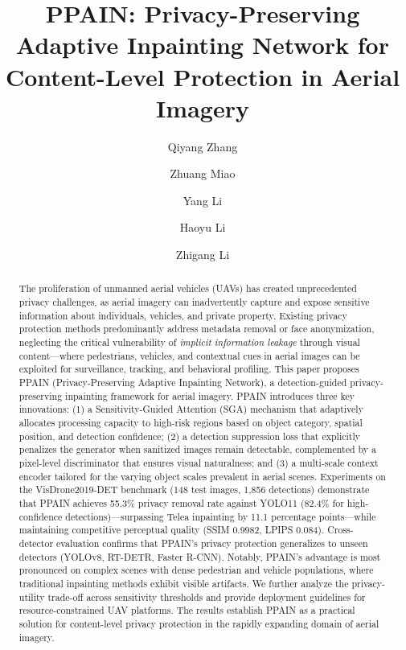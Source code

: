 \documentclass[preprint,12pt]{elsarticle}
\begin{document}
\begin{frontmatter}

\title{PPAIN: Privacy-Preserving Adaptive Inpainting Network for Content-Level Protection in Aerial Imagery}

\author[inst1]{Qiyang Zhang}
\author[inst1]{Zhuang Miao}
\author[inst1]{Yang Li}
\author[inst1]{Haoyu Li}
\author[inst1]{Zhigang Li}



\begin{abstract}
The proliferation of unmanned aerial vehicles (UAVs) has created unprecedented privacy challenges, as aerial imagery can inadvertently capture and expose sensitive information about individuals, vehicles, and private property. Existing privacy protection methods predominantly address metadata removal or face anonymization, neglecting the critical vulnerability of \emph{implicit information leakage} through visual content---where pedestrians, vehicles, and contextual cues in aerial images can be exploited for surveillance, tracking, and behavioral profiling. This paper proposes PPAIN (Privacy-Preserving Adaptive Inpainting Network), a detection-guided privacy-preserving inpainting framework for aerial imagery. PPAIN introduces three key innovations: (1) a Sensitivity-Guided Attention (SGA) mechanism that adaptively allocates processing capacity to high-risk regions based on object category, spatial position, and detection confidence; (2) a detection suppression loss that explicitly penalizes the generator when sanitized images remain detectable, complemented by a pixel-level discriminator that ensures visual naturalness; and (3) a multi-scale context encoder tailored for the varying object scales prevalent in aerial scenes. Experiments on the VisDrone2019-DET benchmark (148 test images, 1,856 detections) demonstrate that PPAIN achieves 55.3\% privacy removal rate against YOLO11 (82.4\% for high-confidence detections)---surpassing Telea inpainting by 11.1 percentage points---while maintaining competitive perceptual quality (SSIM 0.9982, LPIPS 0.084). Cross-detector evaluation confirms that PPAIN's privacy protection generalizes to unseen detectors (YOLOv8, RT-DETR, Faster R-CNN). Notably, PPAIN's advantage is most pronounced on complex scenes with dense pedestrian and vehicle populations, where traditional inpainting methods exhibit visible artifacts. We further analyze the privacy-utility trade-off across sensitivity thresholds and provide deployment guidelines for resource-constrained UAV platforms. The results establish PPAIN as a practical solution for content-level privacy protection in the rapidly expanding domain of aerial imagery.


\end{abstract}
\end{frontmatter}
\end{document}

